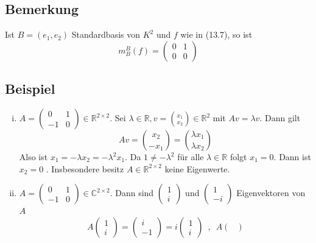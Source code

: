 \subsection{Bemerkung} %
\label{sub:bemerkung}
Ist $B =(e_1, e_2)$ Standardbasis von $K^2$ und $f$ wie in (13.7),  so ist 
\[
	m_B^B(f) = \begin{pmatrix}
		0 & 1 \\
		0 & 0
	\end{pmatrix}
\]

\subsection{Beispiel} %
\label{sub:beispiel}
\begin{enumerate}[(i)]
	\item $A= \begin{pmatrix}
		0 & 1 \\
		-1 & 0
	\end{pmatrix} \in \mathds{R}^{2 \times 2}$. Sei $\lambda \in \mathds{R} , v = \binom{x_1}{x_2} \in \mathds{R}^2$ mit $Av= \lambda v$. Dann gilt
	\[
		Av = \binom{x_2}{-x_1} = \binom{\lambda x_1}{\lambda x_2}
	\]
	Also ist $x_1 = - \lambda x_2 = - \lambda^2 x_1 $. Da $1 \not= - \lambda ^2 $ für alle $ \lambda \in \mathds{R} $ folgt $x_1 = 0$. Dann ist $x_2 = 0$ . 
	Insbesondere besitz $A \in \mathds{R}^{2 \times 2}$ keine Eigenwerte.
	\item $A= \begin{pmatrix}
		0 & 1 \\
		-1 & 0
	\end{pmatrix} \in \mathds{C}^{2 \times 2}$. Dann sind $\begin{pmatrix}
		1 \\ i
	\end{pmatrix} $ und $\begin{pmatrix}
		1 \\ - i
	\end{pmatrix}$ Eigenvektoren von $A$
	\[
		A \begin{pmatrix}
		1 \\ i
	\end{pmatrix} = \begin{pmatrix}
		i \\ -1
	\end{pmatrix} = i \begin{pmatrix}
		1 \\ i
	\end{pmatrix} \enspace , \enspace A \begin{pmatrix}

\end{pmatrix}\]
\end{enumerate}
